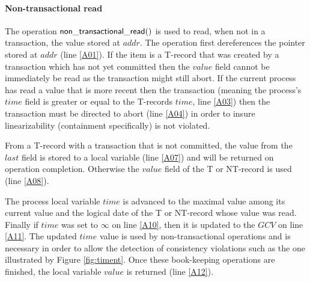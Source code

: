 \documentclass[11pt,letterpaper]{article}
\begin{document}
\paragraph{Non-transactional read}
The   operation  ${\sf   non\_transactional\_read()}$  is   used   to  read,
when not in a transaction, the value stored at
$\mathit{addr}$.
The  operation first  dereferences  the pointer  stored at  $\mathit{addr}$
(line \ref{A01}).
If the item is a T-record that was created by a 
transaction which  has not yet  committed then the $\mathit{value}$ field
cannot be immediately be read as the transaction might still abort.
If the current process has read a value that is more recent then the transaction
(meaning the process's $\mathit{time}$ field is greater or equal to the T-records
$\mathit{time}$, line \ref{A03}) then the transaction must be directed to abort (line \ref{A04})
in order to insure linearizability (containment specifically) is not violated.

From a T-record with a transaction that is not committed, the value from the $\mathit{last}$
field is stored to a local variable (line \ref{A07}) and will be returned on operation completion.
Otherwise the $\mathit{value}$ field of the T or NT-record is used (line \ref{A08}).


The process local variable $\mathit{time}$ is advanced to 
the maximal 
value among its current 
value and the logical date of the T or NT-record whose value was read.
Finally if $\mathit{time}$ was set to $\infty$ on line \ref{A10}, then it is updated
to the $\mathit{GCV}$ on line \ref{A11}.
The updated  $\mathit{time}$
value is used by non-transactional operations and is necessary in order to allow 
the detection of consistency 
violations such as the one illustrated by Figure \ref{fig:timent}. 
Once these book-keeping 
operations are finished, the local variable $\mathit{value}$
is returned (line \ref{A12}).
\end{document}
